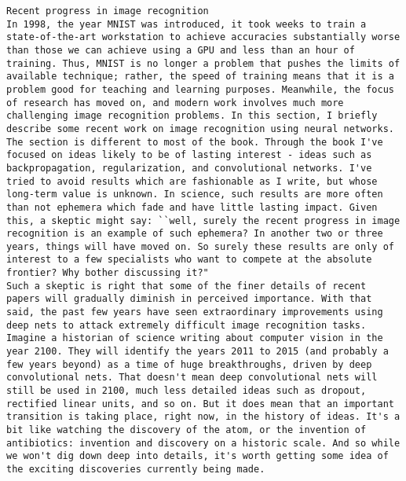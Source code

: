 \begin{lstlisting}
Recent progress in image recognition
In 1998, the year MNIST was introduced, it took weeks to train a state-of-the-art workstation to achieve accuracies substantially worse than those we can achieve using a GPU and less than an hour of training. Thus, MNIST is no longer a problem that pushes the limits of available technique; rather, the speed of training means that it is a problem good for teaching and learning purposes. Meanwhile, the focus of research has moved on, and modern work involves much more challenging image recognition problems. In this section, I briefly describe some recent work on image recognition using neural networks.
The section is different to most of the book. Through the book I've focused on ideas likely to be of lasting interest - ideas such as backpropagation, regularization, and convolutional networks. I've tried to avoid results which are fashionable as I write, but whose long-term value is unknown. In science, such results are more often than not ephemera which fade and have little lasting impact. Given this, a skeptic might say: ``well, surely the recent progress in image recognition is an example of such ephemera? In another two or three years, things will have moved on. So surely these results are only of interest to a few specialists who want to compete at the absolute frontier? Why bother discussing it?"
Such a skeptic is right that some of the finer details of recent papers will gradually diminish in perceived importance. With that said, the past few years have seen extraordinary improvements using deep nets to attack extremely difficult image recognition tasks. Imagine a historian of science writing about computer vision in the year 2100. They will identify the years 2011 to 2015 (and probably a few years beyond) as a time of huge breakthroughs, driven by deep convolutional nets. That doesn't mean deep convolutional nets will still be used in 2100, much less detailed ideas such as dropout, rectified linear units, and so on. But it does mean that an important transition is taking place, right now, in the history of ideas. It's a bit like watching the discovery of the atom, or the invention of antibiotics: invention and discovery on a historic scale. And so while we won't dig down deep into details, it's worth getting some idea of the exciting discoveries currently being made.

\end{lstlisting}
